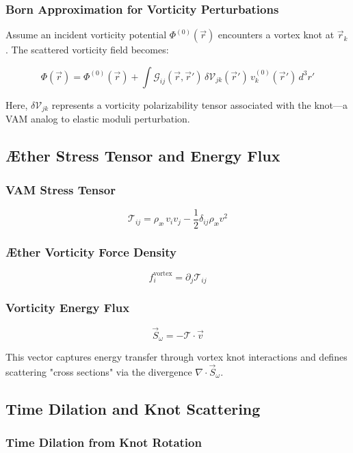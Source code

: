 \subsubsection*{Born Approximation for Vorticity Perturbations}

Assume an incident vorticity potential \(\Phi^{(0)}(\vec{r})\) encounters a vortex knot at \(\vec{r}_k\). The scattered vorticity field becomes:

\[
\Phi(\vec{r}) = \Phi^{(0)}(\vec{r}) + \int \mathcal{G}_{ij}(\vec{r}, \vec{r}') \, \delta \mathcal{V}_{jk}(\vec{r}') \, v_k^{(0)}(\vec{r}') \, d^3r'
\]

Here, \(\delta \mathcal{V}_{jk}\) represents a vorticity polarizability tensor associated with the knot—a VAM analog to elastic moduli perturbation.

\subsection{Æther Stress Tensor and Energy Flux}

\subsubsection*{VAM Stress Tensor}

\[
\mathcal{T}_{ij} = \rho_{\text{\ae}} \, v_i v_j - \frac{1}{2} \delta_{ij} \rho_{\text{\ae}} v^2
\]

\subsubsection*{Æther Vorticity Force Density}

\[
f_i^{\text{vortex}} = \partial_j \mathcal{T}_{ij}
\]

\subsubsection*{Vorticity Energy Flux}

\[
\vec{S}_\omega = - \mathcal{T} \cdot \vec{v}
\]

This vector captures energy transfer through vortex knot interactions and defines scattering "cross sections" via the divergence \(\nabla \cdot \vec{S}_\omega\).

\subsection{Time Dilation and Knot Scattering}

\subsubsection*{Time Dilation from Knot Rotation}

